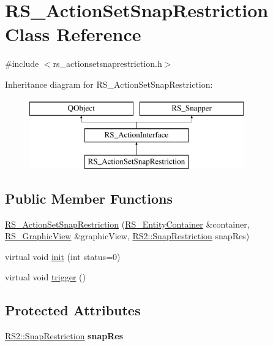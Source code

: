 \hypertarget{classRS__ActionSetSnapRestriction}{\section{R\-S\-\_\-\-Action\-Set\-Snap\-Restriction Class Reference}
\label{classRS__ActionSetSnapRestriction}
}


{\ttfamily \#include $<$rs\-\_\-actionsetsnaprestriction.\-h$>$}

Inheritance diagram for R\-S\-\_\-\-Action\-Set\-Snap\-Restriction\-:\begin{figure}[H]
\begin{center}
\leavevmode
\includegraphics[height=3.000000cm]{classRS__ActionSetSnapRestriction}
\end{center}
\end{figure}
\subsection*{Public Member Functions}
\begin{DoxyCompactItemize}
\item 
\hyperlink{classRS__ActionSetSnapRestriction_a30c93daf443b2d3f85b4804e8be1f808}{R\-S\-\_\-\-Action\-Set\-Snap\-Restriction} (\hyperlink{classRS__EntityContainer}{R\-S\-\_\-\-Entity\-Container} \&container, \hyperlink{classRS__GraphicView}{R\-S\-\_\-\-Graphic\-View} \&graphic\-View, \hyperlink{classRS2_aac67b6890a08cff619c0fbef48377bae}{R\-S2\-::\-Snap\-Restriction} snap\-Res)
\item 
virtual void \hyperlink{classRS__ActionSetSnapRestriction_a2a0b4bd07b08585c2d22f27eab4e984f}{init} (int status=0)
\item 
virtual void \hyperlink{classRS__ActionSetSnapRestriction_aae47557c35970c345f00da2699698f54}{trigger} ()
\end{DoxyCompactItemize}
\subsection*{Protected Attributes}
\begin{DoxyCompactItemize}
\item 
\hypertarget{classRS__ActionSetSnapRestriction_a8507846189d3044a48d5729b36456ef4}{\hyperlink{classRS2_aac67b6890a08cff619c0fbef48377bae}{R\-S2\-::\-Snap\-Restriction} {\bfseries snap\-Res}}\label{classRS__ActionSetSnapRestriction_a8507846189d3044a48d5729b36456ef4}

\end{DoxyCompactItemize}
